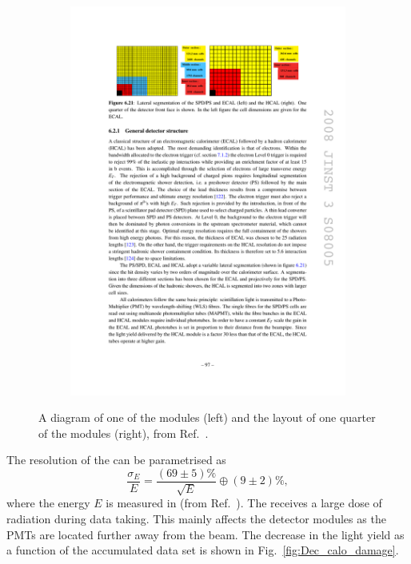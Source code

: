 \begin{figure}[!h]
\begin{subfigure}[m]{0.4\textwidth}
        \includegraphics[width=1.0\textwidth]{figs/Detector/hcal_layout.pdf}
    \end{subfigure}
    \caption{A diagram of one of the \hcal modules (left) and the layout of one quarter of the \hcal modules (right), from Ref.~\cite{Alves:2008zz}.}
    \label{fig:Dec_hcal_layout}   
\end{figure}


The resolution of the \hcal can be parametrised as 
\begin{equation}
\frac{\sigma_{E}}{E} = \frac{(69\pm5)\%}{\sqrt{E}} \oplus (9\pm2)\%,
\end{equation}
where the energy $E$ is measured in \gev (from Ref.~\cite{1748-0221-12-07-C07024}).
The \hcal receives a large dose of radiation during data taking. This mainly affects the detector modules as the PMTs are located further away from the beam. The decrease in the light yield as a function of the accumulated data set is shown in Fig.~\ref{fig:Dec_calo_damage}.


